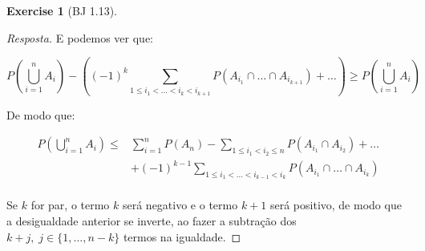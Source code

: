 \documentclass[
]{article}
\theoremstyle{definition}
\theoremstyle{definition}
\theoremstyle{definition}
\newtheorem{exercise}{Exercise}[section]
\theoremstyle{definition}
\theoremstyle{remark}
\begin{document}
\begin{exercise}[BJ 1.13]
\begin{proof}[Resposta]
E podemos ver que:

\begin{equation*}
P\left(\bigcup_{i=1}^{n} A_{i}\right) - \left((-1)^{k} \sum_{1 \le i_{1} < \dots < i_{k} < i_{k+1}}P(A_{i_{1}} \cap \dots \cap A_{i_{k+1}}) + \dots \right) \ge P\left(\bigcup_{i=1}^{n} A_{i}\right)
\end{equation*}

De modo que:

\begin{align*}
P\left(\bigcup_{i=1}^{n} A_{i}\right) \le &\sum_{i=1}^{n}P(A_{n}) - \sum_{1 \le i_{1} < i_{2} \le n}P(A_{i_{1}} \cap A_{i_{2}}) + \dots \\
&+ (-1)^{k-1} \sum_{1 \le i_{1} < \dots < i_{k-1} < i_{k}}P(A_{i_{1}} \cap \dots \cap A_{i_{k}}) \\
\end{align*}

Se \(k\) for par, o termo \(k\) será negativo e o termo \(k+1\) será positivo, de modo que a desigualdade anterior se inverte, ao fazer a subtração dos \(k+j,\; j \in \{1,\dots , n-k\}\) termos na igualdade.
\end{proof}

\end{exercise}
\end{document}
